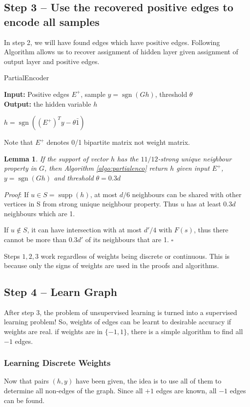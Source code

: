 \documentclass[11pt]{article}
\newcommand{\sgn}{\operatorname{sgn}}
\newcommand{\supp}{\operatorname{supp}}
\newtheorem{lemma}{Lemma}
\begin{document}
	\subsection{Step 3 -- Use the recovered positive edges to encode all samples} In step 2, we will have found edges which have positive edges. Following Algorithm allows us to recover assignment of hidden layer given assignment of output layer and positive edges.

	\begin{algorithm}
		\caption{PartialEncoder}
		\label{algo:partialenco}
		\textbf{Input:} Positive edges $E^+$, sample $y = \sgn(Gh)$, threshold $\theta$\\
		\textbf{Output:} the hidden variable $h$
		\begin{algorithmic}
			\RETURN $h = \sgn((E^+)^Ty-\theta\bar{1})$
		\end{algorithmic}
	\end{algorithm}

	Note that $E^+$ denotes 0/1 bipartite matrix not weight matrix. 

	\begin{lemma}
		If the support of vector $h$ has the $11/12$-strong unique neighbour property in $G$, then Algorithm \ref{algo:partialenco} return $h$ given input $E^+$, $y = \sgn(Gh)$ and threshold $\theta = 0.3d$
	\end{lemma}
	\emph{Proof}: If $u \in S = \supp(h)$, at most $d/6$ neighbours can be shared with other vertices in S from strong unique neighbour property. Thus $u$ has at least $0.3d$ neighbours which are 1. 

	If $u \notin S$, it can have intersection with at most $d'/4$ with $F(s)$, thus there cannot be more than $0.3d'$ of its neighbours that are 1. $\square$

	\smallskip
	Steps $1,2,3$ work regardless of weights being discrete or continuous. This is because only the signs of weights are used in the proofs and algorithms. 

	\subsection{Step 4 -- Learn Graph}
	After step 3, the problem of unsupervised learning is turned into a supervised learning problem! So, weights of edges can be learnt to desirable accuracy if weights are real. if weights are in $\{-1,1\}$, there is a simple algorithm to find all $-1$ edges.

	\subsubsection*{Learning Discrete Weights}
	Now that pairs $(h,y)$ have been given, the idea is to use all of them to determine all non-edges of the graph. Since all $+1$ edges are known, all $-1$ edges can be found. 
\end{document}
